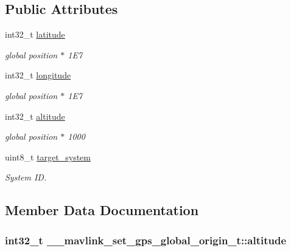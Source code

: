 \subsection*{Public Attributes}
\begin{DoxyCompactItemize}
\item 
int32\+\_\+t \hyperlink{struct____mavlink__set__gps__global__origin__t_aae0adf1cfbd99eef18d9d43fdb0418dd}{latitude}
\begin{DoxyCompactList}\small\item\em global position $\ast$ 1\+E7 \end{DoxyCompactList}\item 
int32\+\_\+t \hyperlink{struct____mavlink__set__gps__global__origin__t_a1558c474ba2b7f246bb22f170677f4d3}{longitude}
\begin{DoxyCompactList}\small\item\em global position $\ast$ 1\+E7 \end{DoxyCompactList}\item 
int32\+\_\+t \hyperlink{struct____mavlink__set__gps__global__origin__t_ae86e137844aafd0a7fc6502b355cd0a2}{altitude}
\begin{DoxyCompactList}\small\item\em global position $\ast$ 1000 \end{DoxyCompactList}\item 
\hypertarget{struct____mavlink__set__gps__global__origin__t_a8b0950dbed98f3f0515bb5726bc5184c}{uint8\+\_\+t \hyperlink{struct____mavlink__set__gps__global__origin__t_a8b0950dbed98f3f0515bb5726bc5184c}{target\+\_\+system}}\label{struct____mavlink__set__gps__global__origin__t_a8b0950dbed98f3f0515bb5726bc5184c}

\begin{DoxyCompactList}\small\item\em System I\+D. \end{DoxyCompactList}\end{DoxyCompactItemize}


\subsection{Member Data Documentation}
\hypertarget{struct____mavlink__set__gps__global__origin__t_ae86e137844aafd0a7fc6502b355cd0a2}{
\subsubsection[{altitude}]{\setlength{\rightskip}{0pt plus 5cm}int32\+\_\+t \+\_\+\+\_\+mavlink\+\_\+set\+\_\+gps\+\_\+global\+\_\+origin\+\_\+t\+::altitude}}\label{struct____mavlink__set__gps__global__origin__t_ae86e137844aafd0a7fc6502b355cd0a2}


